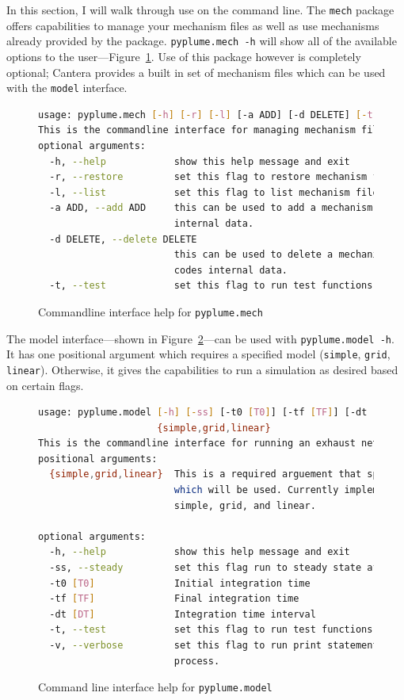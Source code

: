 \documentclass[smallextended,referee]{svjour3}
\newenvironment{codeblock}[1]
{
\begin{figure}[hbt]
\newcommand{\captionMacro}{#1}
\centering
\begin{tcolorbox}[width=15cm]
}
{
\end{tcolorbox}
\caption{\captionMacro{}}
\end{figure}
}
\begin{document}
In this section, I will walk through use on the command line. The \texttt{mech} package offers capabilities to manage your mechanism files as well as use mechanisms already provided by the package. \texttt{pyplume.mech -h} will show all of the available options to the user---Figure~\ref{code:mech}. Use of this package however is completely optional; Cantera provides a built in set of mechanism files which can be used with the \texttt{model} interface.

\begin{codeblock}{Commandline interface help for \texttt{pyplume.mech}}
\begin{lstlisting}[language=bash]
usage: pyplume.mech [-h] [-r] [-l] [-a ADD] [-d DELETE] [-t]
This is the commandline interface for managing mechanism files of PyPlume.
optional arguments:
  -h, --help            show this help message and exit
  -r, --restore         set this flag to restore mechanism files.
  -l, --list            set this flag to list mechanism files.
  -a ADD, --add ADD     this can be used to add a mechanism file to the codes
                        internal data.
  -d DELETE, --delete DELETE
                        this can be used to delete a mechanism file to the
                        codes internal data.
  -t, --test            set this flag to run test functions.
\end{lstlisting}
\label{code:mech}
\end{codeblock}

The model interface---shown in Figure~\ref{code:model}---can be used with \texttt{pyplume.model -h}. It has one positional argument which requires a specified model (\texttt{simple}, \texttt{grid}, \texttt{linear}). Otherwise, it gives the capabilities to run a simulation as desired based on certain flags.

\begin{codeblock}{Command line interface help for \texttt{pyplume.model}}
\begin{lstlisting}[language=bash]
usage: pyplume.model [-h] [-ss] [-t0 [T0]] [-tf [TF]] [-dt [DT]] [-t] [-v]
                     {simple,grid,linear}
This is the commandline interface for running an exhaust network.
positional arguments:
  {simple,grid,linear}  This is a required arguement that specifies the model
                        which will be used. Currently implemented choices are
                        simple, grid, and linear.

optional arguments:
  -h, --help            show this help message and exit
  -ss, --steady         set this flag run to steady state after integration
  -t0 [T0]              Initial integration time
  -tf [TF]              Final integration time
  -dt [DT]              Integration time interval
  -t, --test            set this flag to run test functions.
  -v, --verbose         set this flag to run print statements during the
                        process.
\end{lstlisting}
\label{code:model}
\end{codeblock}
\end{document}

